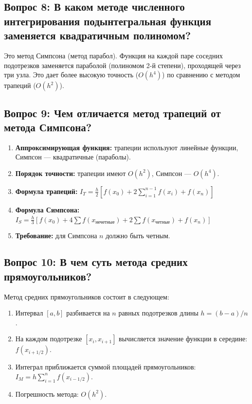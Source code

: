 \documentclass[a4paper,12pt]{article}
\begin{document}
\subsection*{Вопрос 8: В каком методе численного интегрирования подынтегральная функция заменяется квадратичным полиномом?}

Это метод Симпсона (метод парабол). Функция на каждой паре соседних подотрезков заменяется параболой (полиномом 2-й степени), проходящей через три узла. Это дает более высокую точность ($O(h^4)$) по сравнению с методом трапеций ($O(h^2)$).

\subsection*{Вопрос 9: Чем отличается метод трапеций от метода Симпсона?}

\begin{enumerate}
    \item \textbf{Аппроксимирующая функция:} трапеции используют линейные функции, Симпсон --- квадратичные (параболы).
    \item \textbf{Порядок точности:} трапеции имеют $O(h^2)$, Симпсон --- $O(h^4)$.
    \item \textbf{Формула трапеций:} $I_T = \frac{h}{2}[f(x_0) + 2\sum_{i=1}^{n-1}f(x_i) + f(x_n)]$
    \item \textbf{Формула Симпсона:} $I_S = \frac{h}{3}[f(x_0) + 4\sum f(x_{нечетные}) + 2\sum f(x_{четные}) + f(x_n)]$
    \item \textbf{Требование:} для Симпсона $n$ должно быть четным.
\end{enumerate}

\subsection*{Вопрос 10: В чем суть метода средних прямоугольников?}

Метод средних прямоугольников состоит в следующем:
\begin{enumerate}
    \item Интервал $[a,b]$ разбивается на $n$ равных подотрезков длины $h = (b-a)/n$.
    \item На каждом подотрезке $[x_i, x_{i+1}]$ вычисляется значение функции в середине: $f(x_{i+1/2})$.
    \item Интеграл приближается суммой площадей прямоугольников: $I_M = h\sum_{i=1}^{n} f(x_{i-1/2})$.
    \item Погрешность метода: $O(h^2)$.
\end{enumerate}
\end{document}
